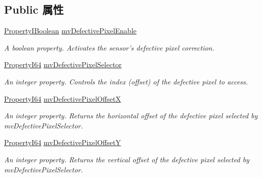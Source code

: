 \subsection*{Public 属性}
\begin{DoxyCompactItemize}
\item 
\hyperlink{group___common_interface_ga44f9437e24b21b6c93da9039ec6786aa}{Property\+I\+Boolean} \hyperlink{classmv_i_m_p_a_c_t_1_1acquire_1_1_gen_i_cam_1_1mv_defective_pixel_correction_control_ac986d55f2cd37273af4915b39fa451a1}{mv\+Defective\+Pixel\+Enable}
\begin{DoxyCompactList}\small\item\em A boolean property. Activates the sensor's defective pixel correction. \end{DoxyCompactList}\item 
\hyperlink{group___common_interface_ga81749b2696755513663492664a18a893}{Property\+I64} \hyperlink{classmv_i_m_p_a_c_t_1_1acquire_1_1_gen_i_cam_1_1mv_defective_pixel_correction_control_aa641704fe6e34fd75e1a894674cd0641}{mv\+Defective\+Pixel\+Selector}
\begin{DoxyCompactList}\small\item\em An integer property. Controls the index (offset) of the defective pixel to access. \end{DoxyCompactList}\item 
\hyperlink{group___common_interface_ga81749b2696755513663492664a18a893}{Property\+I64} \hyperlink{classmv_i_m_p_a_c_t_1_1acquire_1_1_gen_i_cam_1_1mv_defective_pixel_correction_control_a8248f54afba3baa709bcfc59f6d8ba0f}{mv\+Defective\+Pixel\+Offset\+X}
\begin{DoxyCompactList}\small\item\em An integer property. Returns the horizontal offset of the defective pixel selected by mv\+Defective\+Pixel\+Selector. \end{DoxyCompactList}\item 
\hyperlink{group___common_interface_ga81749b2696755513663492664a18a893}{Property\+I64} \hyperlink{classmv_i_m_p_a_c_t_1_1acquire_1_1_gen_i_cam_1_1mv_defective_pixel_correction_control_a168ab762c3f2b0026c3c40b2eea7bc9b}{mv\+Defective\+Pixel\+Offset\+Y}
\begin{DoxyCompactList}\small\item\em An integer property. Returns the vertical offset of the defective pixel selected by mv\+Defective\+Pixel\+Selector. \end{DoxyCompactList}\item 

\end{DoxyCompactItemize}
